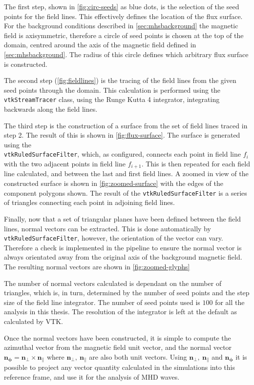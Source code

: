\documentclass[a4paper,12pt,fourier,authoryear,custommargin]{Classes/PhDThesisPSnPDF}
\renewcommand{\vec}{\mathbf}
\begin{document}
The first step, shown in \cref{fig:circ-seeds} as blue dots, is the selection of the seed points for the field lines.
This effectively defines the location of the flux surface.
For the background conditions described in \cref{sec:mhsbackground} the magnetic field is axisymmetric, therefore a circle of seed points is chosen at the top of the domain, centred around the axis of the magnetic field defined in \cref{sec:mhsbackground}.
The radius of this circle defines which arbitrary flux surface is constructed.

The second step (\cref{fig:fieldlines}) is the tracing of the field lines from the given seed points through the domain.
This calculation is performed using the \verb|vtkStreamTracer| class, using the Runge Kutta 4 integrator, integrating backwards along the field lines.

The third step is the construction of a surface from the set of field lines traced in step 2.
The result of this is shown in \cref{fig:flux-surface}.
The surface is generated using the \\ \verb|vtkRuledSurfaceFilter|, which, as configured, connects each point in field line $f_i$ with the two adjacent points in field line $f_{i+1}$.
This is then repeated for each field line calculated, and between the last and first field lines.
A zoomed in view of the constructed surface is shown in \cref{fig:zoomed-surface} with the edges of the component polygons shown.
The result of the \verb|vtkRuledSurfaceFilter| is a series of triangles connecting each point in adjoining field lines.

Finally, now that a set of triangular planes have been defined between the field lines, normal vectors can be extracted.
This is done automatically by\\ \verb|vtkRuledSurfaceFilter|, however, the orientation of the vector can vary.
Therefore a check is implemented in the pipeline to ensure the normal vector is always orientated away from the original axis of the background magnetic field.
The resulting normal vectors are shown in \cref{fig:zoomed-glyphs}

The number of normal vectors calculated is dependant on the number of triangles, which is, in turn, determined by the number of seed points and the step size of the field line integrator.
The number of seed points used is $100$ for all the analysis in this thesis.
The resolution of the integrator is left at the default as calculated by VTK.

Once the normal vectors have been constructed, it is simple to compute the azimuthal vector from the magnetic field unit vector, and the normal vector $\vec{n_\phi}= \vec{n_\perp} \times \vec{n_\parallel}$ where $\vec{n_\perp},\ \vec{n_\parallel} $ are also both unit vectors. 
Using  $\vec{n_\perp},\ \vec{n_\parallel}$ and $\vec{n_\phi}$ it  is possible to project any vector quantity calculated in the simulations into this reference frame, and use it for the analysis of MHD waves.
\end{document}
